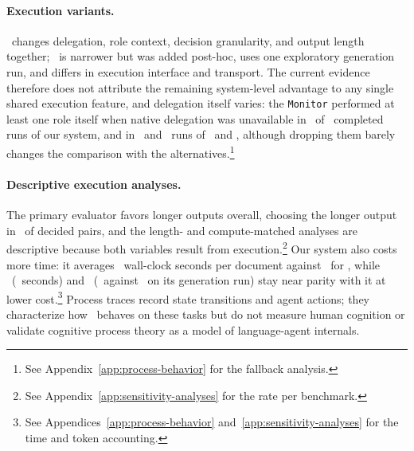\paragraph{Execution variants.}
\condSingleWriter\ changes delegation, role context, decision granularity, and output length together; \condSingleContext\ is narrower but was added post-hoc, uses one exploratory generation run, and differs in execution interface and transport.
The current evidence therefore does not attribute the remaining system-level advantage to any single shared execution feature, and delegation itself varies: the \texttt{Monitor} performed at least one role itself when native delegation was unavailable in \AfourFallbackRuns\ of \AfourRunCount\ completed runs of our system, and in \AfiveFallbackRuns\ and \AsixFallbackRuns\ runs of \condNoGoals\ and \condFixedOrder, although dropping them barely changes the comparison with the alternatives.\footnote{See Appendix~\ref{app:process-behavior} for the fallback analysis.}

\paragraph{Descriptive execution analyses.}
The primary evaluator favors longer outputs overall, choosing the longer output in \LengthRuleAcrossRate\ of decided pairs, and the length- and compute-matched analyses are descriptive because both variables result from execution.\footnote{See Appendix~\ref{app:sensitivity-analyses} for the rate per benchmark.}
Our system also costs more time: it averages \AfourMeanSecondsMean\ wall-clock seconds per document against \AoneMeanSecondsMean\ for \condSinglePass, while \condNoGoals\ (\AfiveMeanSecondsMean\ seconds) and \condSingleContext\ (\SingleContextMeanSeconds\ against \AfourMeanSeconds\ on its generation run) stay near parity with it at lower cost.\footnote{See Appendices~\ref{app:process-behavior} and~\ref{app:sensitivity-analyses} for the time and token accounting.}
Process traces record state transitions and agent actions; they characterize how \condAgenticCogWriter\ behaves on these tasks but do not measure human cognition or validate cognitive process theory as a model of language-agent internals.
